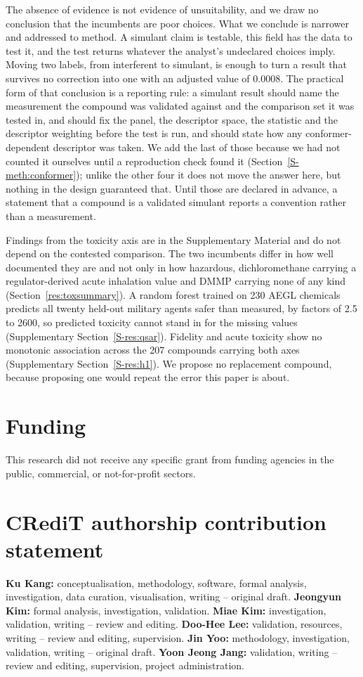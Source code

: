 \documentclass[1p,times]{elsarticle}
\begin{document}
The absence of evidence is not evidence of unsuitability, and we draw no
conclusion that the incumbents are poor choices. What we conclude is narrower
and addressed to method. A simulant claim is testable, this field has
the data to test it, and the test returns whatever the analyst's undeclared
choices imply. Moving two labels, from interferent to simulant, is enough to
turn a result that survives no correction into one with an adjusted value of
0.0008. The practical form of that conclusion is a reporting rule: a
simulant result should name the measurement the compound was validated against
and the comparison set it was tested in, and should fix the panel, the
descriptor space, the statistic and the descriptor weighting before the test is
run, and should state how any conformer-dependent descriptor was taken. We add
the last of those because we had not counted it ourselves until a reproduction
check found it (Section~\ref{S-meth:conformer}); unlike the other four it does
not move the answer here, but nothing in the design guaranteed that. Until those are declared in
advance, a statement that a compound is a validated simulant reports a convention
rather than a measurement.

Findings from the toxicity axis are in the Supplementary Material and do not
depend on the contested comparison. The two incumbents differ in how well
documented they are and not only in how hazardous, dichloromethane carrying a
regulator-derived acute inhalation value and DMMP carrying none of any kind
(Section~\ref{res:toxsummary}). A random forest trained
on 230 AEGL chemicals predicts all twenty held-out military agents safer than
measured, by factors of 2.5 to 2600, so predicted toxicity cannot stand in for
the missing values (Supplementary Section~\ref{S-res:qsar}). Fidelity and acute
toxicity show no monotonic association across the 207 compounds carrying both axes
(Supplementary Section~\ref{S-res:h1}). We propose no replacement compound,
because proposing one would repeat the error this paper is about.

\section*{Funding}
This research did not receive any specific grant from funding agencies in the
public, commercial, or not-for-profit sectors.

\section*{CRediT authorship contribution statement}
\textbf{Ku Kang:} conceptualisation, methodology, software, formal analysis,
investigation, data curation, visualisation, writing -- original draft.
\textbf{Jeongyun Kim:} formal analysis, investigation, validation.
\textbf{Miae Kim:} investigation, validation, writing -- review and editing.
\textbf{Doo-Hee Lee:} validation, resources, writing -- review and
editing, supervision. \textbf{Jin Yoo:} methodology, investigation,
validation, writing -- original draft. \textbf{Yoon Jeong Jang:} validation,
writing -- review and editing, supervision, project administration.
\end{document}
